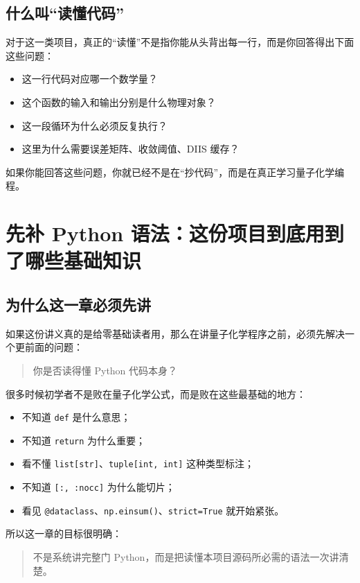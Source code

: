 \documentclass[UTF8,11pt,fontset=fandol]{ctexbook}
\begin{document}
\section{什么叫“读懂代码”}

对于这一类项目，真正的“读懂”不是指你能从头背出每一行，而是你回答得出下面这些问题：
\begin{itemize}
  \item 这一行代码对应哪一个数学量？
  \item 这个函数的输入和输出分别是什么物理对象？
  \item 这一段循环为什么必须反复执行？
  \item 这里为什么需要误差矩阵、收敛阈值、DIIS 缓存？
\end{itemize}

如果你能回答这些问题，你就已经不是在“抄代码”，而是在真正学习量子化学编程。

\chapter{先补 Python 语法：这份项目到底用到了哪些基础知识}

\section{为什么这一章必须先讲}

如果这份讲义真的是给零基础读者用，那么在讲量子化学程序之前，必须先解决一个更前面的问题：

\begin{quote}
你是否读得懂 Python 代码本身？
\end{quote}

很多时候初学者不是败在量子化学公式，而是败在这些最基础的地方：
\begin{itemize}
  \item 不知道 \texttt{def} 是什么意思；
  \item 不知道 \texttt{return} 为什么重要；
  \item 看不懂 \texttt{list[str]}、\texttt{tuple[int, int]} 这种类型标注；
  \item 不知道 \texttt{[:, :nocc]} 为什么能切片；
  \item 看见 \texttt{@dataclass}、\texttt{np.einsum()}、\texttt{strict=True} 就开始紧张。
\end{itemize}

所以这一章的目标很明确：

\begin{quote}
不是系统讲完整门 Python，而是把读懂本项目源码所必需的语法一次讲清楚。
\end{quote}
\end{document}

